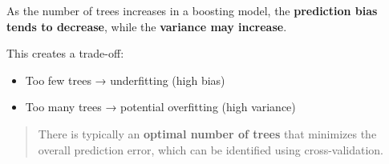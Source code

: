 \documentclass[
  letterpaper,
  DIV=11,
  numbers=noendperiod]{scrreprt}
\providecommand{\tightlist}{%
  \setlength{\itemsep}{0pt}\setlength{\parskip}{0pt}}\usepackage{longtable,booktabs,array}
\begin{document}
As the number of trees increases in a boosting model, the
\textbf{prediction bias tends to decrease}, while the \textbf{variance
may increase}.

This creates a trade-off:

\begin{itemize}
\tightlist
\item
  Too few trees → underfitting (high bias)\\
\item
  Too many trees → potential overfitting (high variance)
\end{itemize}

\begin{quote}
There is typically an \textbf{optimal number of trees} that minimizes
the overall prediction error, which can be identified using
cross-validation.
\end{quote}
\end{document}
